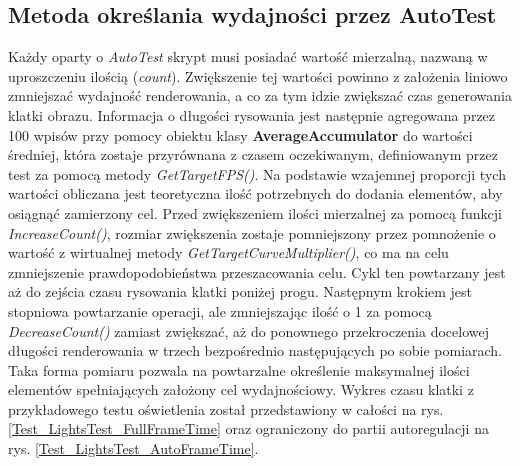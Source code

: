 	\subsection{Metoda określania wydajności przez AutoTest}
	Każdy oparty o \textit{AutoTest} skrypt musi posiadać wartość mierzalną, nazwaną w uproszczeniu ilością (\textit{count}). Zwiększenie tej wartości powinno z założenia liniowo zmniejszać wydajność renderowania, a co za tym idzie zwiększać czas generowania klatki obrazu. Informacja o długości rysowania jest następnie agregowana przez 100 wpisów przy pomocy obiektu klasy \textbf{AverageAccumulator} do wartości średniej, która zostaje przyrównana z czasem oczekiwanym, definiowanym przez test za pomocą metody \textit{GetTargetFPS()}. Na podstawie wzajemnej proporcji tych wartości obliczana jest teoretyczna ilość potrzebnych do dodania elementów, aby osiągnąć zamierzony cel. Przed zwiększeniem ilości mierzalnej za pomocą funkcji \textit{IncreaseCount()}, rozmiar zwiększenia zostaje pomniejszony przez pomnożenie o wartość z wirtualnej metody \textit{GetTargetCurveMultiplier()}, co ma na celu zmniejszenie prawdopodobieństwa przeszacowania celu. Cykl ten powtarzany jest aż do zejścia czasu rysowania klatki poniżej progu. Następnym krokiem jest stopniowa powtarzanie operacji, ale zmniejszając ilość o 1 za pomocą \textit{DecreaseCount()} zamiast zwiększać, aż do ponownego przekroczenia docelowej długości renderowania w trzech bezpośrednio następujących po sobie pomiarach. Taka forma pomiaru pozwala na powtarzalne określenie maksymalnej ilości elementów spełniających założony cel wydajnościowy. Wykres czasu klatki z przykładowego testu oświetlenia został przedstawiony w całości na rys. \ref{Test_LightsTest_FullFrameTime} oraz ograniczony do partii autoregulacji na rys. \ref{Test_LightsTest_AutoFrameTime}.
	
